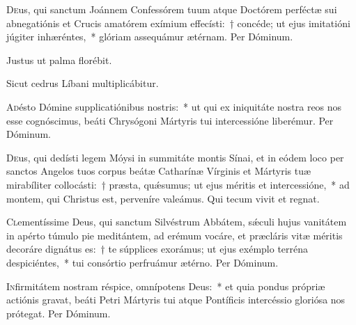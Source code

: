 \documentclass[vesperale_romanum]{subfiles}
\begin{document}
\oratio

\lettrine{D}{e}us, qui sanctum Joánnem Confessórem tuum atque Do\-ctórem perféctæ sui abnegatiónis et Crucis amatórem exímium effecísti:~† concéde; ut ejus imitatióni júgiter inhæréntes,~* glóriam assequámur ætérnam. Per Dóminum.




\vv Justus ut palma florébit.

\rr Sicut cedrus Líbani multiplicábitur.



\lettrine{A}{d}ésto Dómine supplicatiónibus nostris:~* ut qui ex iniquitáte nostra reos nos esse cognóscimus, beáti Chrysógoni Mártyris tui intercessióne liberémur.
Per Dóminum.

\capitdeseq
 
\myrule


\duplex

\oratio

\lettrine{D}{e}us, qui dedísti legem Móysi in summitáte montis Sínai, et in eódem loco per san\-ctos Angelos tuos corpus beátæ Catharínæ Vírginis et Mártyris tuæ mirabíliter collocásti:~† præsta, quǽsumus; ut ejus méritis et intercessióne,~* ad montem, qui Christus est, perveníre valeámus. Qui tecum vivit et regnat.

\myrule


\duplex

\oratio

\lettrine{C}{l}ementíssime Deus, qui sanctum Silvéstrum Abbátem, sǽculi hujus vanitátem in apérto túmulo pie meditántem, ad erémum vocáre, et præcláris vitæ méritis decoráre dignátus es:~† te súpplices exorámus; ut ejus exémplo terréna despiciéntes,~* tui consórtio perfruámur ætérno.
Per Dóminum.



\oratio

\lettrine{I}{n}firmitátem nostram réspice, omnípotens Deus:~* et quia pondus própriæ actiónis gravat, beáti Petri Mártyris tui atque Pontíficis intercéssio gloriósa nos prótegat.
Per Dóminum.
\end{document}
